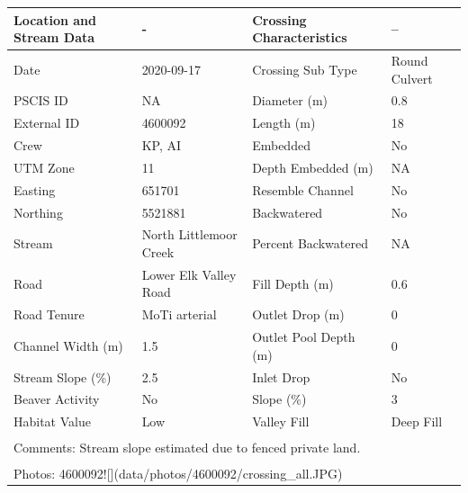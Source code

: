 \documentclass[
]{book}
\begin{document}
\begin{tabular}{l|l|l|l}
\hline
Location and Stream Data & - & Crossing Characteristics & --\\
\hline
Date & 2020-09-17 & Crossing Sub Type & Round Culvert\\
\hline
PSCIS ID & NA & Diameter (m) & 0.8\\
\hline
External ID & 4600092 & Length (m) & 18\\
\hline
Crew & KP, AI & Embedded & No\\
\hline
UTM Zone & 11 & Depth Embedded (m) & NA\\
\hline
Easting & 651701 & Resemble Channel & No\\
\hline
Northing & 5521881 & Backwatered & No\\
\hline
Stream & North Littlemoor Creek & Percent Backwatered & NA\\
\hline
Road & Lower Elk Valley Road & Fill Depth (m) & 0.6\\
\hline
Road Tenure & MoTi arterial & Outlet Drop (m) & 0\\
\hline
Channel Width (m) & 1.5 & Outlet Pool Depth (m) & 0\\
\hline
Stream Slope (\%) & 2.5 & Inlet Drop & No\\
\hline
Beaver Activity & No & Slope (\%) & 3\\
\hline
Habitat Value & Low & Valley Fill & Deep Fill\\
\hline
\multicolumn{4}{l}{\textsuperscript{} Comments: Stream slope estimated due to fenced private land.}\\
\multicolumn{4}{l}{\textsuperscript{} Photos: 4600092![](data/photos/4600092/crossing\_all.JPG)}\\
\end{tabular}
\end{document}

